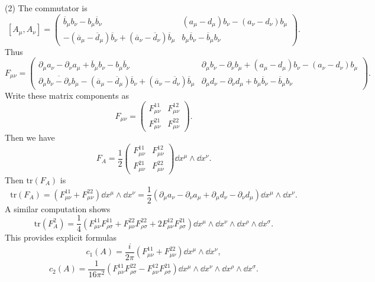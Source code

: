 \documentclass[11pt, letterpaper]{article}
\theoremstyle{plain}
\begin{document}
(2) The commutator is
\[
	[A_\mu ,A_\nu ] = \begin{pmatrix}
	\overline{b}_\mu b_\nu  - b_\mu \overline{b} _\nu  & (a_\mu -d_\mu )b_\nu -(a_\nu -d_\nu )b_\mu  \\
	-(\overline{a} _\mu - \overline{d} _\mu )\overline{b} _\nu +(\overline{a} _\nu - \overline{d} _\nu )\overline{b} _\mu  & b_\mu \overline{b} _\nu - \overline{b} _\mu b_\nu 
	\end{pmatrix}
.\]
Thus
\[
	F_{\mu \nu } = \begin{pmatrix}
	\partial _\mu a_\nu -\partial _\nu a_\mu +\overline{b}_\mu b_\nu  - b_\mu \overline{b} _\nu  & \partial _\mu b_\nu -\partial _\nu b_\mu +(a_\mu -d_\mu )b_\nu -(a_\nu -d_\nu )b_\mu  \\
	\overline{\partial _\mu b_\nu -\partial _\nu b_\mu } -(\overline{a} _\mu - \overline{d} _\mu )\overline{b} _\nu +(\overline{a} _\nu - \overline{d} _\nu )\overline{b} _\mu  & \partial _\mu d_\nu -\partial _\nu d_\mu + b_\mu \overline{b} _\nu - \overline{b} _\mu b_\nu 
	\end{pmatrix}
.\]
Write these matrix components as
\[
	F_{\mu \nu } =\begin{pmatrix}
	F^{11}_{\mu \nu }  & F^{12}_{\mu \nu }  \\
	F^{21}_{\mu \nu }  & F^{22}_{\mu \nu } 
	\end{pmatrix}
.\]
Then we have
\[
	F_A = \frac{1}{2} \begin{pmatrix}
	F^{11}_{\mu \nu }  & F^{12}_{\mu \nu }  \\
	F^{21} _{\mu \nu }  & F^{22}_{\mu \nu } 
	\end{pmatrix}\dd x^\mu \wedge \dd x^\nu 
.\]
Then $\mathrm{tr}(F_A)$ is
\[
	\mathrm{tr} (F_A)=\left(F_{\mu \nu } ^{11} + F^{22}_{\mu \nu } \right)\dd x^\mu \wedge \dd x^\nu = \frac{1}{2} \left( \partial _\mu a_\nu -\partial _\nu a_\mu +\partial _\mu d_\nu -\partial _\nu d_\mu  \right) \dd x^\mu \wedge \dd x^\nu 
.\]
A similar computation shows
\[
	\mathrm{tr}(F_A^2) = \frac{1}{4}\left( F_{\mu \nu } ^{11} F_{\rho \sigma } ^{11} + F_{\mu \nu } ^{22} F_{\rho \sigma } ^{22} + 2 F_{\mu \nu } ^{12} F^{21}_{\rho \sigma }  \right) \dd x^\mu \wedge \dd x^\nu \wedge \dd x^\rho \wedge \dd x^\sigma 
.\]
This provides explicit formulas
\[
	c_1(A) = \frac{i}{2\pi } \left(F_{\mu \nu } ^{11} + F^{22}_{\mu \nu } \right)\dd x^\mu \wedge \dd x^\nu,
\]
\[
	c_2(A) = \frac{1}{16\pi^2} \left( F_{\mu \nu}^{11} F_{\rho \sigma}^{22} - F_{\mu \nu}^{12} F_{\rho \sigma}^{21} \right) \dd x^\mu \wedge \dd x^\nu \wedge \dd x^\rho \wedge \dd x^\sigma
.\]
\end{document}
